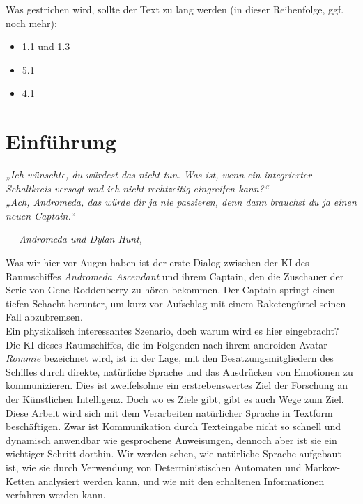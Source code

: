 \documentclass[12pt,twoside]{article}
\theoremstyle{plain}
\theoremstyle{definition}
\theoremstyle{remark}
\begin{document}
\setcounter{tocdepth}{2} 					%
\tableofcontents
{}
\clearpage


Was gestrichen wird, sollte der Text zu lang werden (in dieser Reihenfolge, ggf. noch mehr):
\begin{itemize}
	\item 1.1 und 1.3
	\item 5.1
	\item 4.1
\end{itemize}
\section{Einführung}
\label{sec:intro}
	\textit{„Ich wünschte, du würdest das nicht tun.
	Was ist, wenn ein integrierter Schaltkreis versagt und ich nicht rechtzeitig eingreifen kann?“\\
	„Ach, Andromeda, das würde dir ja nie passieren, denn dann brauchst du ja einen neuen Captain.“}
	\begin{flushright}
		\textit{-~~Andromeda und Dylan Hunt, \cite{ADA101}}
	\end{flushright}
	Was wir hier vor Augen haben ist der erste Dialog zwischen der KI des Raumschiffes \textit{Andromeda Ascendant} und ihrem Captain, den die Zuschauer der Serie von Gene Roddenberry zu hören bekommen.
	Der Captain springt einen tiefen Schacht herunter, um kurz vor Aufschlag mit einem Raketengürtel seinen Fall abzubremsen.\\
	Ein physikalisch interessantes Szenario, doch warum wird es hier eingebracht?\\
	Die KI dieses Raumschiffes, die im Folgenden nach ihrem androiden Avatar \textit{Rommie} bezeichnet wird, ist in der Lage, mit den Besatzungsmitgliedern des Schiffes durch direkte, natürliche Sprache und das Ausdrücken von Emotionen zu kommunizieren.
	Dies ist zweifelsohne ein erstrebenswertes Ziel der Forschung an der Künstlichen Intelligenz.
	Doch wo es Ziele gibt, gibt es auch Wege zum Ziel.
	Diese Arbeit wird sich mit dem Verarbeiten natürlicher Sprache in Textform beschäftigen.
	Zwar ist Kommunikation durch Texteingabe nicht so schnell und dynamisch anwendbar wie gesprochene Anweisungen, dennoch aber ist sie ein wichtiger Schritt dorthin.
	Wir werden sehen, wie natürliche Sprache aufgebaut ist, wie sie durch Verwendung von Deterministischen Automaten und Markov-Ketten analysiert werden kann, und wie mit den erhaltenen Informationen verfahren werden kann.
\end{document}
